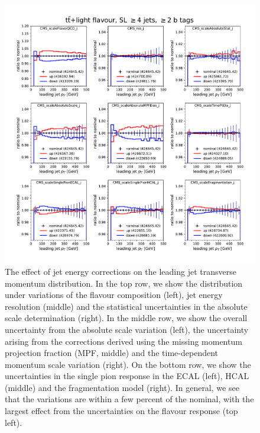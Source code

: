\begin{figure}
\begin{centering}
\includegraphics[width=1.0\textwidth]{figures/tth/sl_jge4_tge2_jec_unc.pdf}
\caption[Effect of jet energy corrections.]{The effect of jet energy corrections on the leading jet transverse momentum distribution. In the top row, we show the distribution under variations of the flavour composition (left), jet energy resolution (middle) and the statistical uncertainties in the absolute scale determination (right). In the middle row, we show the overall uncertainty from the absolute scale variation (left), the uncertainty arising from the corrections derived using the missing momentum projection fraction (MPF, middle) and the time-dependent momentum scale variation (right). On the bottom row, we show the uncertainties in the single pion response in the ECAL (left), HCAL (middle) and the fragmentation model (right). In general, we see that the variations are within a few percent of the nominal, with the largest effect from the uncertainties on the flavour response (top left).}
\label{fig:jec_pt_effect}
\end{centering}
\end{figure}

